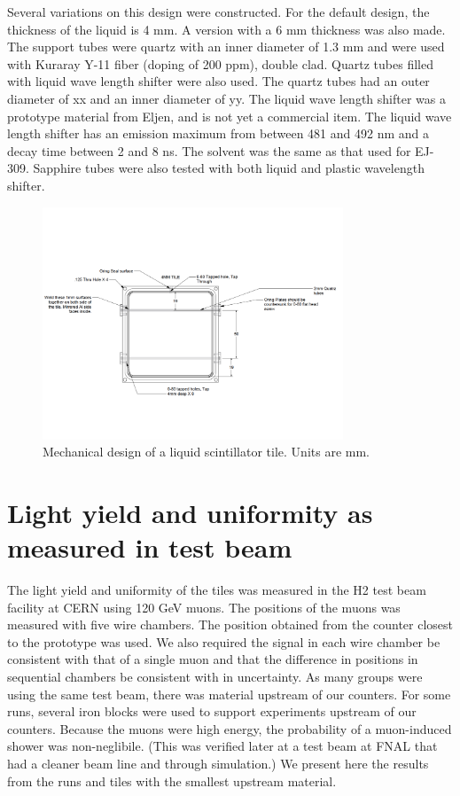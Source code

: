 \documentclass[review]{elsarticle}
\begin{document}
Several variations on this design were constructed.  For the default design, the thickness of the liquid is 4 mm.  A version with a 6 mm thickness was also made.  The support tubes were quartz with an inner diameter of 1.3 mm and were used with Kuraray Y-11 fiber (doping of 200 ppm), double clad.  Quartz tubes filled with liquid wave length shifter were also used.  The quartz tubes had
an outer diameter of xx and an inner diameter of yy.  The liquid wave length shifter was a prototype material from Eljen, and is not yet a commercial item.
The liquid wave length shifter has an emission maximum from between 
481 and 492 nm and a decay time between 2 and 8 ns.  
The solvent was the same as that used for EJ-309.
Sapphire tubes were also tested with both liquid and plastic wavelength shifter.


\begin{figure}[!ht]
\begin{center}
\includegraphics[width=0.8\textwidth]{mechanicaldesign.pdf}
\caption{
Mechanical design of a liquid scintillator tile.  Units are mm.
}
\label{fig:tiledesign}
\end{center}
\end{figure}



\section{Light yield and uniformity as measured in test beam}

The light yield and uniformity of the tiles was measured in the H2 test beam facility at CERN using 120 GeV muons.  The positions of the muons was measured with five wire chambers. The position obtained from the counter closest to the
prototype was used.  We also required the signal in each wire chamber be consistent with that of a single muon and that the difference in positions in sequential chambers be consistent with in uncertainty.
As many groups were using the same test beam, there was material upstream of our counters.  For some runs, several iron blocks were used to support experiments upstream of our counters.  Because the muons were high energy, the probability of a muon-induced shower was non-neglibile.  (This was verified later at a test beam at FNAL that had a cleaner beam line and through simulation.)  We present here the results
from the runs and tiles with the smallest upstream material.
\end{document}
